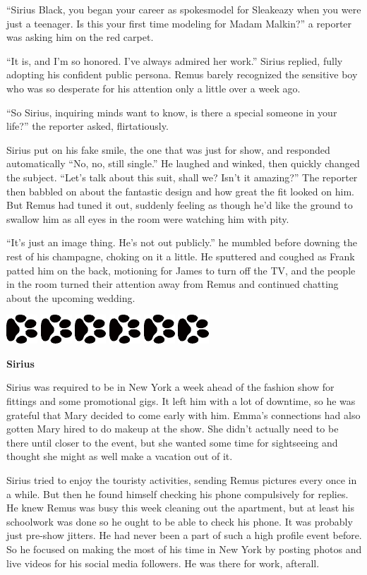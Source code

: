 \documentclass[12pt,twoside,openright]{memoir}
\newcommand{\dogPrintRule}{	
	\begin{center}
		\hspace{.5em}
		\includegraphics[angle=60]{dogprint.pdf}
		\hspace{.5em}
		\includegraphics[angle=120]{dogprint.pdf}
		\hspace{.5em}
		\includegraphics[angle=60]{dogprint.pdf}
		\hspace{.5em}
		\includegraphics[angle=120]{dogprint.pdf}
		\hspace{.5em}
		\includegraphics[angle=60]{dogprint.pdf}
		\hspace{.5em}
		\includegraphics[angle=120]{dogprint.pdf}
		\hspace{.5em}
	\end{center}
}
\begin{document}
``Sirius Black, you began your career as spokesmodel for Sleakeazy when you were just a teenager. Is this your first time modeling for Madam Malkin?'' a reporter was asking him on the red carpet.

``It is, and I'm so honored. I've always admired her work.'' Sirius replied, fully adopting his confident public persona. Remus barely recognized the sensitive boy who was so desperate for his attention only a little over a week ago. 

``So Sirius, inquiring minds want to know, is there a special someone in your life?'' the reporter asked, flirtatiously. 

Sirius put on his fake smile, the one that was just for show, and responded automatically ``No, no, still single.'' He laughed and winked, then quickly changed the subject. ``Let's talk about this suit, shall we? Isn't it amazing?'' The reporter then babbled on about the fantastic design and how great the fit looked on him. But Remus had tuned it out, suddenly feeling as though he'd like the ground to swallow him as all eyes in the room were watching him with pity.

``It's just an image thing. He's not out publicly.'' he mumbled before downing the rest of his champagne, choking on it a little. He sputtered and coughed as Frank patted him on the back, motioning for James to turn off the TV, and the people in the room turned their attention away from Remus and continued chatting about the upcoming wedding. 

\dogPrintRule

\textbf{Sirius} 

Sirius was required to be in New York a week ahead of the fashion show for fittings and some promotional gigs. It left him with a lot of downtime, so he was grateful that Mary decided to come early with him. Emma's connections had also gotten Mary hired to do makeup at the show. She didn't actually need to be there until closer to the event, but she wanted some time for sightseeing and thought she might as well make a vacation out of it. 

Sirius tried to enjoy the touristy activities, sending Remus pictures every once in a while. But then he found himself checking his phone compulsively for replies. He knew Remus was busy this week cleaning out the apartment, but at least his schoolwork was done so he ought to be able to check his phone. It was probably just pre-show jitters. He had never been a part of such a high profile event before. So he focused on making the most of his time in New York by posting photos and live videos for his social media followers. He was there for work, afterall.
\end{document}
